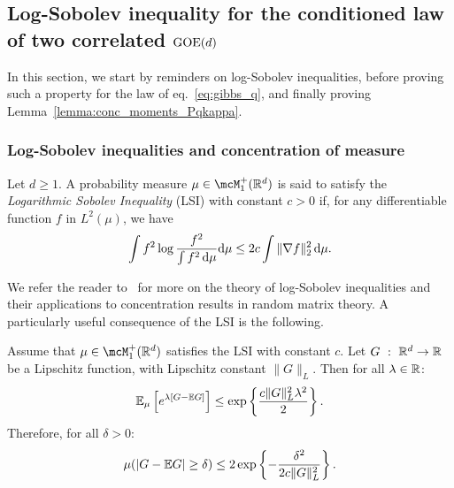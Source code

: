 \subsection{Log-Sobolev inequality for the conditioned law of two correlated \texorpdfstring{$\mathrm{GOE}(d)$}{}}
\label{subsec:lsi}

In this section, we start by reminders on log-Sobolev inequalities, before proving such a property 
for the law of eq.~\eqref{eq:gibbs_q}, and finally proving Lemma~\ref{lemma:conc_moments_Pqkappa}.

\subsubsection{Log-Sobolev inequalities and concentration of measure}\label{subsubsec:lsi}

\begin{definition}\label{def:lsi}
    Let $d \geq 1$.
    A probability measure $\mu \in \mcM_1^+(\bbR^d)$ is said to satisfy the \emph{Logarithmic Sobolev Inequality} (LSI) with constant $c > 0$ if, for any differentiable function 
    $f$ in $L^2(\mu)$, we have 
    \begin{equation}
        \label{eq:lsi}
        \int f^2 \log \frac{f^2}{\int f^2 \, \mathrm{d} \mu} \mathrm{d} \mu \leq 2 c \int \|\nabla f\|_2^2 \, \mathrm{d} \mu.
    \end{equation}
\end{definition}
\noindent
We refer the reader to~\cite{guionnet2009large,anderson2010introduction}
for more on the theory of log-Sobolev inequalities and their applications to concentration results in random matrix theory.
A particularly useful consequence of the LSI is the following. 
\begin{lemma}[Herbst]\label{lemma:herbst}
   Assume that $\mu \in \mcM_1^+(\bbR^d)$ satisfies the LSI with constant $c$. Let $G~:~\mathbb{R}^d \to \mathbb{R}$ be a Lipschitz function, with Lipschitz constant $\|G\|_L$. 
   Then for all $\lambda \in \mathbb{R}$: 
   \begin{align}\label{eq:herbst_MGF}
    \mathbb{E}_\mu \left[e^{\lambda[G - \mathbb{E} G]}\right] \leq \exp\left\{\frac{c \|G\|_L^2\lambda^2}{2}\right\}.
   \end{align}
   Therefore, for all 
   $\delta > 0$: 
   \begin{equation*}
    \mu(|G - \mathbb{E} G| \geq \delta) \leq 2 \exp\left\{-\frac{\delta^2}{2 c \|G\|_L^2}\right\}.
   \end{equation*}
\end{lemma}
\noindent
{}

